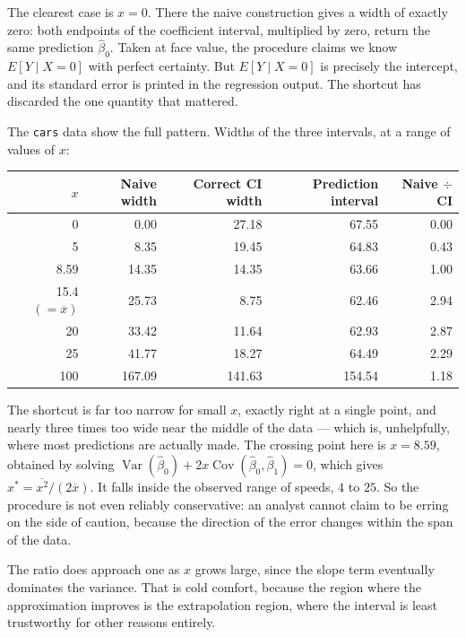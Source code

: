 \documentclass[11pt]{report}
\newcommand{\Var}{\operatorname{Var}}
\begin{document}
The clearest case is \(x=0\). There the naive construction gives a width of exactly zero: both endpoints of the coefficient interval, multiplied by zero, return the same prediction \(\widehat{\beta}_0\). Taken at face value, the procedure claims we know \(E[Y\mid X=0]\) with perfect certainty. But \(E[Y\mid X=0]\) is precisely the intercept, and its standard error is printed in the regression output. The shortcut has discarded the one quantity that mattered.

The \texttt{cars} data show the full pattern. Widths of the three intervals, at a range of values of \(x\):

\begin{center}
\begin{tabular}{rrrrr}
\toprule
\(x\) & Naive width & Correct CI width & Prediction interval & Naive \(\div\) CI\\
\midrule
0    & 0.00   & 27.18  & 67.55 & 0.00\\
5    & 8.35   & 19.45  & 64.83 & 0.43\\
8.59 & 14.35  & 14.35  & 63.66 & 1.00\\
15.4 \((=\overline{x})\) & 25.73 & 8.75 & 62.46 & 2.94\\
20   & 33.42  & 11.64  & 62.93 & 2.87\\
25   & 41.77  & 18.27  & 64.49 & 2.29\\
100  & 167.09 & 141.63 & 154.54 & 1.18\\
\bottomrule
\end{tabular}
\end{center}

The shortcut is far too narrow for small \(x\), exactly right at a single point, and nearly three times too wide near the middle of the data --- which is, unhelpfully, where most predictions are actually made. The crossing point here is \(x=8.59\), obtained by solving \(\Var(\widehat{\beta}_0)+2x\operatorname{Cov}(\widehat{\beta}_0,\widehat{\beta}_1)=0\), which gives \(x^\ast=\overline{x^2}/(2\overline{x})\). It falls inside the observed range of speeds, \(4\) to \(25\). So the procedure is not even reliably conservative: an analyst cannot claim to be erring on the side of caution, because the direction of the error changes within the span of the data.

The ratio does approach one as \(x\) grows large, since the slope term eventually dominates the variance. That is cold comfort, because the region where the approximation improves is the extrapolation region, where the interval is least trustworthy for other reasons entirely.
\end{document}
